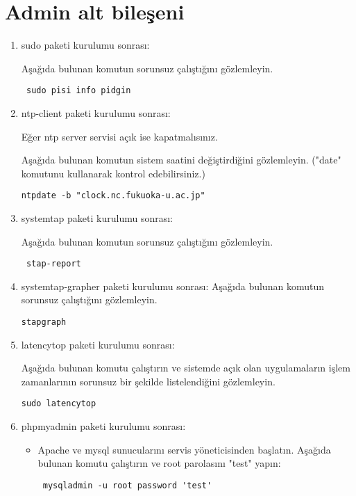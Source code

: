 \documentclass[a4paper,10pt]{article}
\begin{document}
\section{Admin alt bileşeni}
\begin{enumerate}
\item sudo paketi kurulumu sonrası:

Aşağıda bulunan komutun sorunsuz çalıştığını gözlemleyin.
\begin{verbatim}
 sudo pisi info pidgin
\end{verbatim}

\item ntp-client paketi kurulumu sonrası:

Eğer ntp server servisi açık ise kapatmalısınız. 

Aşağıda bulunan komutun sistem saatini değiştirdiğini gözlemleyin.  ("date" komutunu kullanarak kontrol edebilirsiniz.)
\begin{verbatim}
ntpdate -b "clock.nc.fukuoka-u.ac.jp" 
\end{verbatim}

\item systemtap paketi kurulumu sonrası:

Aşağıda bulunan komutun sorunsuz çalıştığını gözlemleyin.
\begin{verbatim}
 stap-report
\end{verbatim}

\item systemtap-grapher paketi kurulumu sonrası:
Aşağıda bulunan komutun sorunsuz çalıştığını gözlemleyin.
\begin{verbatim}
stapgraph
\end{verbatim}


\item latencytop paketi kurulumu sonrası:

Aşağıda bulunan komutu çalıştırın ve sistemde açık olan uygulamaların işlem zamanlarının sorunsuz bir şekilde listelendiğini gözlemleyin.
\begin{verbatim}
sudo latencytop 
\end{verbatim}

 \item phpmyadmin paketi kurulumu sonrası:
\begin{itemize}
 \item Apache ve mysql sunucularını servis yöneticisinden başlatın. Aşağıda bulunan komutu çalıştırın ve root parolasını "test" yapın:
\begin{verbatim}
 mysqladmin -u root password 'test'
\end{verbatim}


\end{itemize}
\end{enumerate}
\end{document}
